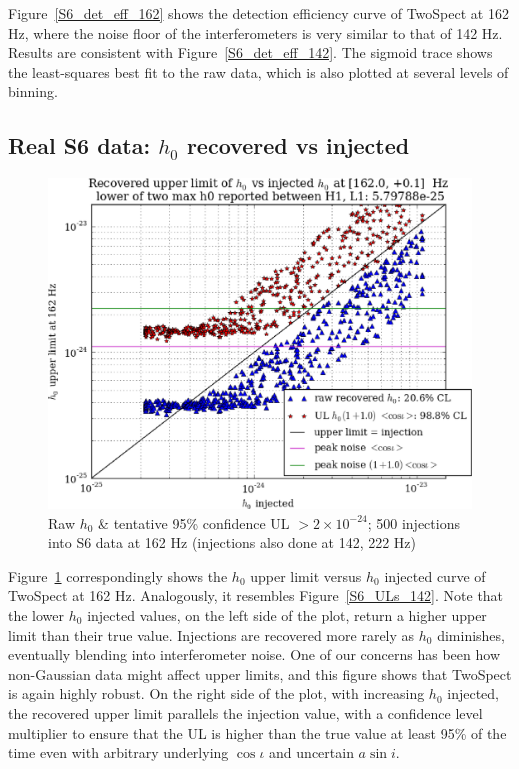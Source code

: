 Figure~\ref{S6_det_eff_162} shows the detection efficiency curve of TwoSpect at 162 Hz, where the noise floor of the interferometers is very similar to that of 142 Hz. 
Results are consistent with Figure~\ref{S6_det_eff_142}.
The sigmoid trace shows the least-squares best fit to the raw data, which is also plotted at several levels of binning.

\subsection{Real S6 data: $h_0$ recovered vs injected}

\begin{figure}
\begin{center}
\includegraphics[width=0.70\paperwidth,height=0.48\paperheight]{plots/h0UL-vs-h0injected-162-0Hz.eps}
\caption{
Raw $h_0$ \& tentative 95\% confidence UL $>2\times10^{-24}$; 500 injections
into S6 data at 162 Hz (injections also done at 142, 222 Hz)}
\label{S6_ULs_162}
\end{center}
\end{figure}


Figure~\ref{S6_ULs_162} correspondingly shows the $h_0$ upper limit versus $h_0$ injected curve of TwoSpect at 162 Hz.
Analogously, it resembles Figure~\ref{S6_ULs_142}.
Note that the lower $h_0$ injected values, on the left side of the plot, return a higher upper limit than their true value.
Injections are recovered more rarely as $h_0$ diminishes, eventually blending into interferometer noise.
One of our concerns has been how non-Gaussian data might affect upper limits, and this figure shows that TwoSpect is again highly robust.
On the right side of the plot, with increasing $h_0$ injected, the recovered upper limit parallels the injection value, with a confidence level multiplier to ensure that the UL is higher than the true value at least 95\% of the time even with arbitrary underlying $\cos \iota$ and uncertain $a \sin i$.

